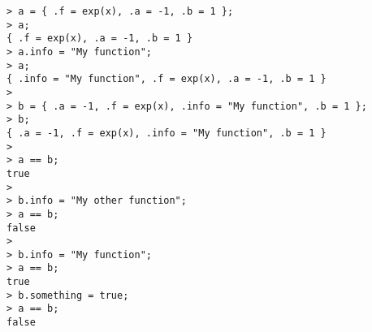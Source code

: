 \begin{center}\begin{minipage}{15cm}\begin{Verbatim}[frame=single]
> a = { .f = exp(x), .a = -1, .b = 1 };
> a;
{ .f = exp(x), .a = -1, .b = 1 }
> a.info = "My function";
> a;
{ .info = "My function", .f = exp(x), .a = -1, .b = 1 }
> 
> b = { .a = -1, .f = exp(x), .info = "My function", .b = 1 };
> b;
{ .a = -1, .f = exp(x), .info = "My function", .b = 1 }
> 
> a == b;
true
> 
> b.info = "My other function";
> a == b;
false
> 
> b.info = "My function";
> a == b;
true
> b.something = true;
> a == b;
false
\end{Verbatim}
\end{minipage}\end{center}
